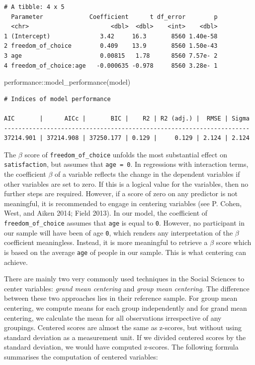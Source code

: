 \documentclass[
  letterpaper,
]{krantz}
\makeatletter
\newenvironment{Shaded}{\begin{snugshade}}{\end{snugshade}}
\newcommand{\FunctionTok}[1]{\textcolor[rgb]{0.28,0.35,0.67}{#1}}
\newcommand{\NormalTok}[1]{\textcolor[rgb]{0.00,0.23,0.31}{#1}}
\newcommand{\SpecialCharTok}[1]{\textcolor[rgb]{0.37,0.37,0.37}{#1}}
\newenvironment{kframe}{%
\medskip{}
\setlength{\fboxsep}{.8em}
 \def\at@end@of@kframe{}%
 \ifinner\ifhmode%
  \def\at@end@of@kframe{\end{minipage}}%
  \begin{minipage}{\columnwidth}%
 \fi\fi%
 \def\FrameCommand##1{\hskip\@totalleftmargin \hskip-\fboxsep
 \colorbox{shadecolor}{##1}\hskip-\fboxsep
     \hskip-\linewidth \hskip-\@totalleftmargin \hskip\columnwidth}%
 \MakeFramed {\advance\hsize-\width
   \@totalleftmargin\z@ \linewidth\hsize
   \@setminipage}}%
 {\par\unskip\endMakeFramed%
 \at@end@of@kframe}
\renewenvironment{Shaded}{\begin{kframe}}{\end{kframe}}
\makeatother
\begin{document}
\begin{verbatim}
# A tibble: 4 x 5
  Parameter             Coefficient      t df_error        p
  <chr>                       <dbl>  <dbl>    <int>    <dbl>
1 (Intercept)              3.42     16.3       8560 1.40e-58
2 freedom_of_choice        0.409    13.9       8560 1.50e-43
3 age                      0.00815   1.78      8560 7.57e- 2
4 freedom_of_choice:age   -0.000635 -0.978     8560 3.28e- 1
\end{verbatim}

\begin{Shaded}
\begin{Highlighting}[]
\NormalTok{performance}\SpecialCharTok{::}\FunctionTok{model\_performance}\NormalTok{(model)}
\end{Highlighting}
\end{Shaded}

\begin{verbatim}
# Indices of model performance

AIC       |      AICc |       BIC |    R2 | R2 (adj.) |  RMSE | Sigma
---------------------------------------------------------------------
37214.901 | 37214.908 | 37250.177 | 0.129 |     0.129 | 2.124 | 2.124
\end{verbatim}

The \(\beta\) score of \texttt{freedom\_of\_choice} unfolds the most
substantial effect on \texttt{satisfaction}, but assumes that
\texttt{age\ =\ 0}. In regressions with interaction terms, the
coefficient \(\beta\) of a variable reflects the change in the dependent
variables if other variables are set to zero. If this is a logical value
for the variables, then no further steps are required. However, if a
score of zero on any predictor is not meaningful, it is recommended to
engage in centering variables (see P. Cohen, West, and Aiken 2014; Field
2013). In our model, the coefficient of \texttt{freedom\_of\_choice}
assumes that \texttt{age} is equal to \texttt{0}. However, no
participant in our sample will have been of age \texttt{0}, which
renders any interpretation of the \(\beta\) coefficient meaningless.
Instead, it is more meaningful to retrieve a \(\beta\) score which is
based on the average \texttt{age} of people in our sample. This is what
centering can achieve.

There are mainly two very commonly used techniques in the Social
Sciences to center variables: \emph{grand mean centering} and
\emph{group mean centering}. The difference between these two approaches
lies in their reference sample. For group mean centering, we compute
means for each group independently and for grand mean centering, we
calculate the mean for all observations irrespective of any groupings.
Centered scores are almost the same as z-scores, but without using
standard deviation as a measurement unit. If we divided centered scores
by the standard deviation, we would have computed z-scores. The
following formula summarises the computation of centered variables:
\end{document}
